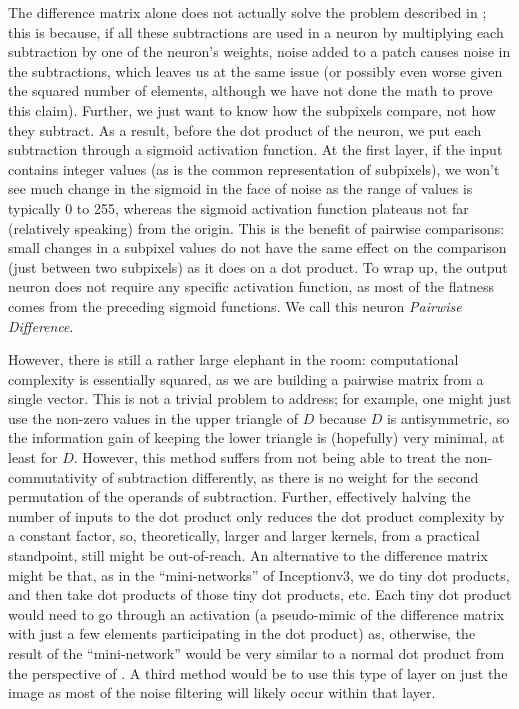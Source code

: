 The difference matrix alone does not actually solve the problem described in
\cite{goodfellow2015explaining}; this is because, if all these subtractions are used in a neuron by
multiplying each subtraction by one of the neuron's weights, noise added to a patch causes noise in
the subtractions, which leaves us at the same issue (or possibly even worse given the squared number
of elements, although we have not done the math to prove this claim). Further, we just want to know
how the subpixels compare, not how they subtract. As a result, before the dot product of the neuron,
we put each subtraction through a sigmoid activation function. At the first layer, if the input
contains integer values (as is the common representation of subpixels), we won't see much change in
the sigmoid in the face of noise as the range of values is typically 0 to 255, whereas the sigmoid
activation function plateaus not far (relatively speaking) from the origin. This is the benefit of
pairwise comparisons: small changes in a subpixel values do not have the same effect on the
comparison (just between two subpixels) as it does on a dot product. To wrap up, the output neuron
does not require any specific activation function, as most of the flatness comes from the preceding
sigmoid functions. We call this neuron \textit{Pairwise Difference}.

However, there is still a rather large elephant in the room: computational complexity is essentially
squared, as we are building a pairwise matrix from a single vector. This is not a trivial problem to
address; for example, one might just use the non-zero values in the upper triangle of $D$ because
$D$ is antisymmetric, so the information gain of keeping the lower triangle is (hopefully) very minimal, at
least for $D$. However, this method suffers from not being able to treat the non-commutativity of
subtraction differently, as there is no weight for the second permutation of the operands of
subtraction. Further, effectively halving the number of inputs to the dot product only reduces the
dot product complexity by a constant factor, so, theoretically, larger and larger kernels, from a
practical standpoint, still might be out-of-reach. An alternative to the difference matrix might be
that, as in the ``mini-networks'' of Inceptionv3\cite{szegedy2015rethinking}, we do tiny dot
products, and then take dot products of those tiny dot products, etc. Each tiny dot product would
need to go through an activation (a pseudo-mimic of the difference matrix with just a few elements
participating in the dot product) as, otherwise, the result of the ``mini-network'' would be very
similar to a normal dot product from the perspective of \cite{goodfellow2015explaining}. A third
method would be to use this type of layer on just the image as most of the noise filtering will
likely occur within that layer.

